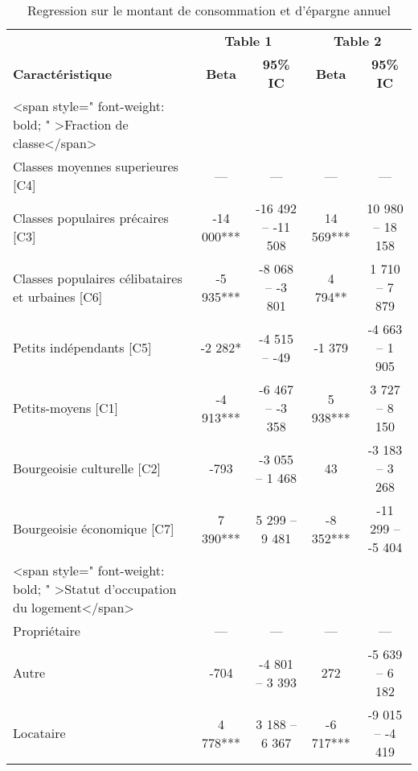 \documentclass[
  12pt,
]{book}
\begin{document}
\begin{table}[!h]
\centering\centering
\caption{Regression sur le montant de consommation et d'épargne annuel}
\centering
\fontsize{8}{10}\selectfont
\fontsize{7}{9}\selectfont
\begin{threeparttable}
\begin{tabular}[t]{lcccc}
\toprule
\multicolumn{1}{c}{ } & \multicolumn{2}{c}{\textbf{Table 1}} & \multicolumn{2}{c}{\textbf{Table 2}} \\
\cmidrule(l{3pt}r{3pt}){2-3} \cmidrule(l{3pt}r{3pt}){4-5}
\textbf{Caractéristique} & \textbf{Beta} & \textbf{95\% IC} & \textbf{Beta} & \textbf{95\% IC}\\
\midrule
<span style=" font-weight: bold;    " >Fraction de classe</span> &  &  &  & \\
\hspace{1em}Classes moyennes superieures [C4] & — & — & — & —\\
\hspace{1em}Classes populaires précaires [C3] & -14 000*** & -16 492 – -11 508 & 14 569*** & 10 980 – 18 158\\
\hspace{1em}Classes populaires célibataires et urbaines [C6] & -5 935*** & -8 068 – -3 801 & 4 794** & 1 710 – 7 879\\
\hspace{1em}Petits indépendants [C5] & -2 282* & -4 515 – -49 & -1 379 & -4 663 – 1 905\\
\addlinespace
\hspace{1em}Petits-moyens [C1] & -4 913*** & -6 467 – -3 358 & 5 938*** & 3 727 – 8 150\\
\hspace{1em}Bourgeoisie culturelle [C2] & -793 & -3 055 – 1 468 & 43 & -3 183 – 3 268\\
\hspace{1em}Bourgeoisie économique [C7] & 7 390*** & 5 299 – 9 481 & -8 352*** & -11 299 – -5 404\\
<span style=" font-weight: bold;    " >Statut d'occupation du logement</span> &  &  &  & \\
\hspace{1em}Propriétaire & — & — & — & —\\
\addlinespace
\hspace{1em}Autre & -704 & -4 801 – 3 393 & 272 & -5 639 – 6 182\\
\hspace{1em}Locataire & 4 778*** & 3 188 – 6 367 & -6 717*** & -9 015 – -4 419\\

\end{tabular}
\end{threeparttable}
\end{table}
\end{document}

